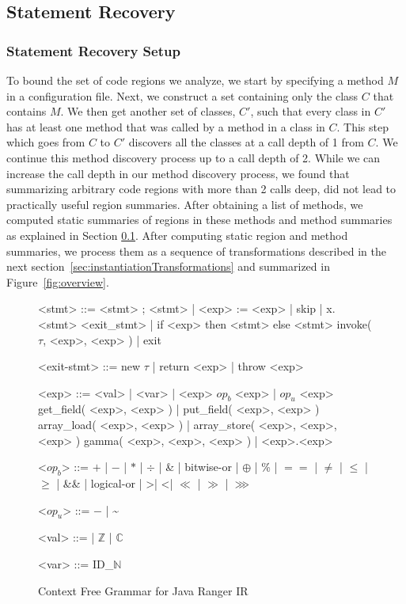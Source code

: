 \subsection{Statement Recovery}
\label{sec:static-analysis}

\subsubsection{Statement Recovery Setup}
%
To bound the set of code regions we analyze, we start by specifying a method $M$ in a configuration file.
%
Next, we construct a set containing only the class $C$ that contains $M$.
%
We then get another set of classes, $C'$,
such that every class in $C'$ has at least one method that was called by a method in a class in $C$.
%
This step which goes from $C$ to $C'$ discovers all the classes at a call depth of 1 from $C$.
%
We continue this method discovery process up to a call depth of 2.
%
While we can increase the call depth in our method discovery process, we found that summarizing
arbitrary code regions with more than 2 calls deep, did not lead to practically useful region summaries.
%
After obtaining a list of methods, we computed static summaries of regions in these methods and method summaries as
explained in Section \ref{sec:static-analysis}.
%
After computing static region and method summaries, we process them as a sequence of transformations described in the next section~\ref{sec:instantiationTransformations} and summarized
in Figure~\ref{fig:overview}.
%


\begin{figure}
\begin{grammar}
<stmt> ::= <stmt> ; <stmt> | <exp> := <exp> | skip | x.<stmt> 
\alt <exit_stmt> | if <exp> then <stmt> else <stmt> 
\alt invoke( $\tau$, <exp>, <exp> )  | exit

<exit-stmt> ::=  new $\tau$  | return <exp> |  throw <exp> 

<exp>  ::= <val> | <var> | <exp> $op_b$ <exp> | $op_u$ <exp>
\alt get_field( <exp>, <exp> ) | put_field( <exp>, <exp> )
\alt array_load( <exp>, <exp> ) | array_store( <exp>, <exp>, <exp> ) 
\alt gamma( <exp>, <exp>, <exp> ) | <exp>.<exp>

<$op_b$> ::= $+$ | $-$ | $*$ | $\div$ | \& | bitwise-or | $\oplus$ | \% | $==$ | $\neq$ | $\leq$ | $\geq$ | \&\& | logical-or | \textgreater | \textless | $\ll$ | $\gg$ | $\ggg$

<$op_u$> ::= $-$ | \textasciitilde

<val> ::= \unit | $\mathbb{Z}$ |  $\mathbb{C}$

<var> ::= ID_$\mathbb{N}$
\end{grammar}
\caption{Context Free Grammar for Java Ranger IR}
\label{fig:grammar}
\end{figure}


